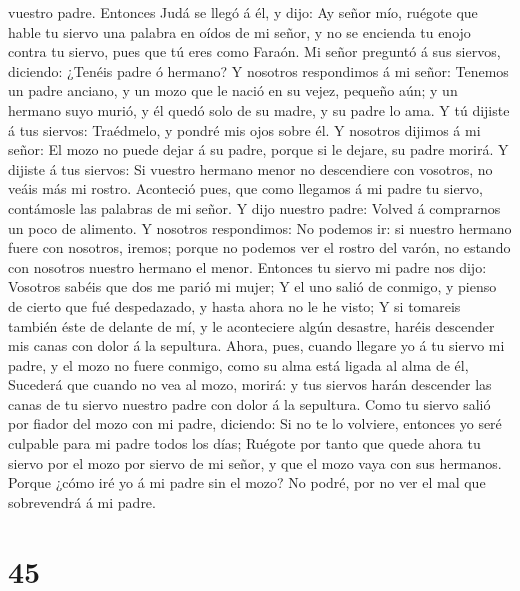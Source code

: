vuestro padre.  Entonces Judá se llegó á él, y dijo: Ay
señor mío, ruégote que hable tu siervo una palabra en oídos de mi señor,
y no se encienda tu enojo contra tu siervo, pues que tú eres como
Faraón.  Mi señor preguntó á sus siervos, diciendo:
¿Tenéis padre ó hermano?  Y nosotros respondimos á mi
señor: Tenemos un padre anciano, y un mozo que le nació en su vejez,
pequeño aún; y un hermano suyo murió, y él quedó solo de su madre, y su
padre lo ama.  Y tú dijiste á tus siervos: Traédmelo, y
pondré mis ojos sobre él.  Y nosotros dijimos á mi señor:
El mozo no puede dejar á su padre, porque si le dejare, su padre morirá.
 Y dijiste á tus siervos: Si vuestro hermano menor no
descendiere con vosotros, no veáis más mi rostro. 
Aconteció pues, que como llegamos á mi padre tu siervo, contámosle las
palabras de mi señor.  Y dijo nuestro padre: Volved á
comprarnos un poco de alimento.  Y nosotros respondimos:
No podemos ir: si nuestro hermano fuere con nosotros, iremos; porque no
podemos ver el rostro del varón, no estando con nosotros nuestro hermano
el menor.  Entonces tu siervo mi padre nos dijo: Vosotros
sabéis que dos me parió mi mujer;  Y el uno salió de
conmigo, y pienso de cierto que fué despedazado, y hasta ahora no le he
visto;  Y si tomareis también éste de delante de mí, y le
aconteciere algún desastre, haréis descender mis canas con dolor á la
sepultura.  Ahora, pues, cuando llegare yo á tu siervo mi
padre, y el mozo no fuere conmigo, como su alma está ligada al alma de
él,  Sucederá que cuando no vea al mozo, morirá: y tus
siervos harán descender las canas de tu siervo nuestro padre con dolor á
la sepultura.  Como tu siervo salió por fiador del mozo
con mi padre, diciendo: Si no te lo volviere, entonces yo seré culpable
para mi padre todos los días;  Ruégote por tanto que
quede ahora tu siervo por el mozo por siervo de mi señor, y que el mozo
vaya con sus hermanos.  Porque ¿cómo iré yo á mi padre
sin el mozo? No podré, por no ver el mal que sobrevendrá á mi padre.

\hypertarget{section-44}{%
\section{45}\label{section-44}}

